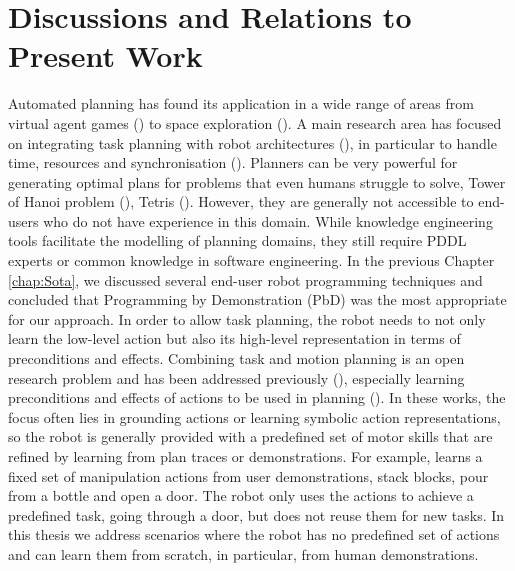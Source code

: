 \section{Discussions and Relations to Present Work}
Automated planning has found its application in a wide range of areas from virtual agent games (\cite{fernandez2006planning}) to space exploration (\cite{backes2004multi,bresina2005activity}).
A main research area has focused on integrating task planning with robot architectures (\cite{cashmore2015rosplan}), in particular to handle time, resources and synchronisation (\cite{di2014planner,dvorak2014flexible}).
Planners can be very powerful for generating optimal plans for problems that even humans struggle to solve, \eg Tower of Hanoi problem (\cite{hanoiPddlGit}), Tetris (\cite{ipc14site}).
However, they are generally not accessible to end-users who do not have experience in this domain. 
While knowledge engineering tools facilitate the modelling of planning domains, they still require PDDL experts or common knowledge in software engineering.
In the previous Chapter \ref{chap:Sota}, we discussed several end-user robot programming techniques and concluded that Programming by Demonstration (PbD) was the most appropriate for our approach.
In order to allow task planning, the robot needs to not only learn the low-level action but also its high-level representation in terms of preconditions and effects.
Combining task and motion planning is an open research problem and has been addressed previously (\cite{ferrer2015planning,garrett2015ffrob}), especially learning preconditions and effects of actions to be used in planning (\cite{jetchev2013learning,ahmadzadeh2015learning,ugur2015bottom,konidaris2018fromSkills}).
In these works, the focus often lies in grounding actions or learning symbolic action representations, so the robot is generally provided with a predefined set of motor skills that are refined by learning from plan traces or demonstrations.
For example, \citet{abdo2013learning} learns a fixed set of manipulation actions from user demonstrations, \ie stack blocks, pour from a bottle and open a door.
The robot only uses the actions to achieve a predefined task, \eg going through a door, but does not reuse them for new tasks.
In this thesis we address scenarios where the robot has no predefined set of actions and can learn them from scratch, in particular, from human demonstrations.

